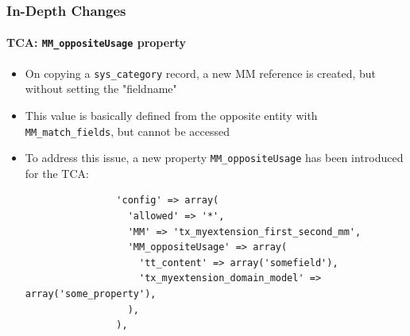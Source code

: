 \begin{frame}[fragile]
	\frametitle{In-Depth Changes}
	\framesubtitle{TCA: \texttt{MM\_oppositeUsage} property}

	\lstset{
		basicstyle=\tiny\ttfamily
	}

	\begin{itemize}
		\item On copying a \texttt{sys\_category} record, a new MM reference is created, but without setting the "fieldname"
		\item This value is basically defined from the opposite entity with \texttt{MM\_match\_fields}, but cannot be accessed
		\item To address this issue, a new property \texttt{MM\_oppositeUsage} has been introduced for the TCA:

			\begin{lstlisting}
				'config' => array(
				  'allowed' => '*',
				  'MM' => 'tx_myextension_first_second_mm',
				  'MM_oppositeUsage' => array(
				    'tt_content' => array('somefield'),
				    'tx_myextension_domain_model' => array('some_property'),
				  ),
				),
			\end{lstlisting}

	\end{itemize}

\end{frame}


